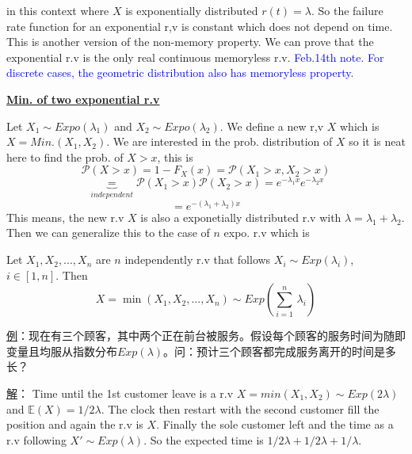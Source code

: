 \documentclass[10.5pt]{article}
\newcommand{\prob}[0]{\mathcal{P}}
\newcommand{\hilight}[1]{\colorbox{orange!20}{#1}}
\newenvironment{changemargin}[2]{%
  \begin{list}{}{%
    \setlength{\topsep}{0pt}%
    \setlength{\leftmargin}{#1}%
    \setlength{\rightmargin}{#2}%
    \setlength{\listparindent}{\parindent}%
    \setlength{\itemindent}{\parindent}%
    \setlength{\parsep}{\parskip}%
  }%
  \item[]}{\end{list}}
\begin{document}
\begin{changemargin}{-0.125in}{0in}
\begin{enumerate}
            		in this context where $X$ is exponentially distributed $r(t) = \lambda$. So the failure rate function for an exponential r,v is constant which \hilight{does not depend on time.} This is another version of the non-memory property. We can prove that the exponential r.v is the only real continuous memoryless r.v. \textcolor{blue}{Feb.14th note. For discrete cases, the geometric distribution also has memoryless property.}
            		
            		\medskip
            		
            		\underline{\textbf{Min. of two exponential r.v}}
            	    
            	    \smallskip
            	    
            	    Let $X_1 \sim Expo(\lambda_1)$ and $X_2 \sim Expo(\lambda_2)$. We define a new r,v $X$ which is $X  = Min.(X_1, X_2)$. We are interested in the prob. distribution of $X$ so it is neat here to find the prob. of $X > x$, this is 
            	    \[
            	     \prob(X > x) = 1 - F_X(x)=  \prob(X_1 > x, X_2>x) 
            	    \]
            	    \[
            	    \underbrace{=}_{independent} \prob(X_1 > x) \prob(X_2 > x) = e^{-\lambda_1 x}e^{-\lambda_2 x}
            	    \]
            		\[
            		 = e^{-(\lambda_1 + \lambda_2)x} 
            		\]
            	    This means, the new r.v $X$ is also a exponetially distributed r.v with $\lambda = \lambda_1 + \lambda_2$. Then we can generalize this to the case of $n$ expo. r.v which is 
            	    \begin{proposition}
            	    	Let $X_1, X_2, ..., X_n$ are $n$ independently r.v that follows $X_i \sim Exp(\lambda_i)$, $i \in [1,n]$. Then 
            	    	\[
            	    	X = \min(X_1, X_2, ..., X_n) \sim Exp(\sum^n_{i = 1}\,\lambda_i)
            	    	\]
            	    \end{proposition}
            	    
                   \underline{例}：现在有三个顾客，其中两个正在前台被服务。假设每个顾客的服务时间为随即变量且均服从指数分布$Exp(\lambda)$。问：预计三个顾客都完成服务离开的时间是多长？ 
                   
                   \smallskip
                   
                   \underline{解}： Time until the 1st customer leave is a r.v $X = min(X_1, X_2) \sim Exp(2\lambda)$ and $\mathbb{E}(X) = 1/2\lambda$. The clock then restart with the second customer fill the position and again the r.v is $X$. Finally the sole customer left and the time as a r.v following $X' \sim Exp(\lambda)$. So the expected time is $1/2\lambda + 1/2\lambda + 1/\lambda$. 
                   

\end{enumerate}
\end{changemargin}
\end{document}

